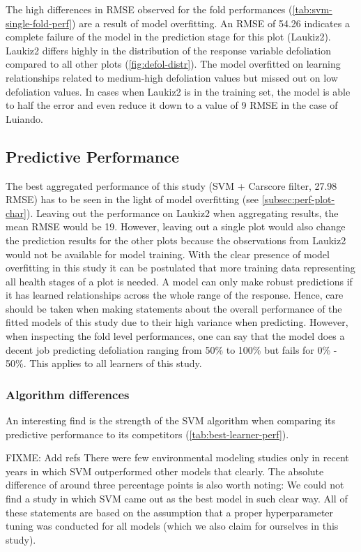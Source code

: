 \documentclass[letterpaper, peerreview]{IEEEtran}
\begin{document}
\noindent The high differences in RMSE observed for the fold performances (\autoref{tab:svm-single-fold-perf}) are a result of model overfitting.
An RMSE of 54.26 indicates a complete failure of the model in the prediction stage for this plot (Laukiz2).
Laukiz2 differs highly in the distribution of the response variable defoliation compared to all other plots (\autoref{fig:defol-distr}).
The model overfitted on learning relationships related to medium-high defoliation values but missed out on low defoliation values.
In cases when Laukiz2 is in the training set, the model is able to half the error and even reduce it down to a value of 9 RMSE in the case of Luiando.

\subsection{Predictive Performance}
The best aggregated performance of this study (SVM + Carscore filter, 27.98 RMSE) has to be seen in the light of model overfitting (see \autoref{subsec:perf-plot-char}).
Leaving out the performance on Laukiz2 when aggregating results, the mean RMSE would be 19.
However, leaving out a single plot would also change the prediction results for the other plots because the observations from Laukiz2 would not be available for model training.
With the clear presence of model overfitting in this study it can be postulated that more training data representing all health stages of a plot is needed.
A model can only make robust predictions if it has learned relationships across the whole range of the response.
Hence, care should be taken when making statements about the overall performance of the fitted models of this study due to their high variance when predicting.
However, when inspecting the fold level performances, one can say that the model does a decent job predicting defoliation ranging from 50\% to 100\% but fails for 0\% - 50\%.
This applies to all learners of this study.

\subsubsection{Algorithm differences}
An interesting find is the strength of the SVM algorithm when comparing its predictive performance to its competitors (\autoref{tab:best-learner-perf}).

FIXME: Add refs
There were few environmental modeling studies only in recent years in which SVM outperformed other models that clearly.
The absolute difference of around three percentage points is also worth noting:
We could not find a study in which SVM came out as the best model in such clear way.
All of these statements are based on the assumption that a proper hyperparameter tuning was conducted for all models (which we also claim for ourselves in this study).
\end{document}
